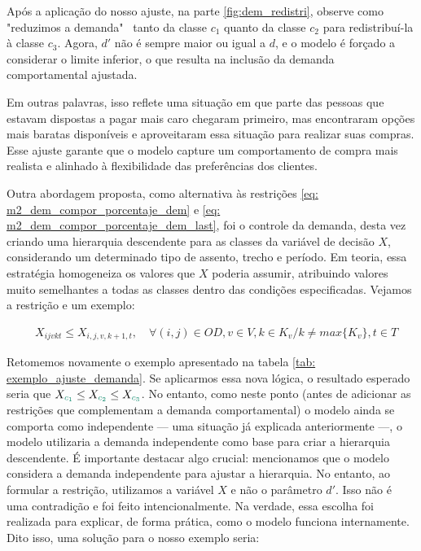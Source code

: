 Após a aplicação do nosso ajuste, na parte \ref{fig:dem_redistri}, observe como "reduzimos a demanda" \, tanto da classe $c_1$ quanto da classe $c_2$ para redistribuí-la à classe $c_3$. Agora, $d'$ não é sempre maior ou igual a $d$, e o modelo é forçado a considerar o limite inferior, o que resulta na inclusão da demanda comportamental ajustada.

Em outras palavras, isso reflete uma situação em que parte das pessoas que estavam dispostas a pagar mais caro chegaram primeiro, mas encontraram opções mais baratas disponíveis e aproveitaram essa situação para realizar suas compras. Esse ajuste garante que o modelo capture um comportamento de compra mais realista e alinhado à flexibilidade das preferências dos clientes.

Outra abordagem proposta, como alternativa às restrições \ref{eq: m2_dem_compor_porcentaje_dem} e \ref{eq: m2_dem_compor_porcentaje_dem_last}, foi o controle da demanda, desta vez criando uma hierarquia descendente para as classes da variável de decisão $X$, considerando um determinado tipo de assento, trecho e período. Em teoria, essa estratégia homogeneiza os valores que $X$ poderia assumir, atribuindo valores muito semelhantes a todas as classes dentro das condições especificadas. Vejamos a restrição e um exemplo:

\allowdisplaybreaks
\begin{align}
	&X_{ijvkt} \leq X_{i,j,v,k+1,t}, \quad   \forall(i,j) \in OD, v \in V, k \in K_v / k \neq max\{K_v\}, t \in T  \label{eq: m2_ajuste_hierarquia}
\end{align}

Retomemos novamente o exemplo apresentado na tabela \ref{tab: exemplo_ajuste_demanda}. Se aplicarmos essa nova lógica, o resultado esperado seria que $X_{\textcolor[rgb]{0.0588, 0.5412, 0.4275}{c_1}} \leq X_{\textcolor[rgb]{0.0588, 0.5412, 0.4275}{c_2}} \leq X_{\textcolor[rgb]{0.0588, 0.5412, 0.4275}{c_3}}$. No entanto, como neste ponto (antes de adicionar as restrições que complementam a demanda comportamental) o modelo ainda se comporta como independente — uma situação já explicada anteriormente —, o modelo utilizaria a demanda independente como base para criar a hierarquia descendente. É importante destacar algo crucial: mencionamos que o modelo considera a demanda independente para ajustar a hierarquia. No entanto, ao formular a restrição, utilizamos a variável $X$ e não o parâmetro $d'$. Isso não é uma contradição e foi feito intencionalmente. Na verdade, essa escolha foi realizada para explicar, de forma prática, como o modelo funciona internamente. Dito isso, uma solução para o nosso exemplo seria:

